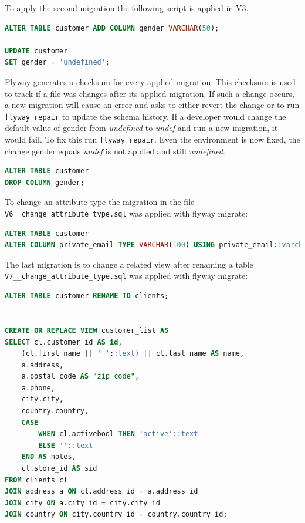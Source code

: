 %
To apply the second migration the following script is applied in V3.
\begin{lstlisting}[language=SQL]
ALTER TABLE customer ADD COLUMN gender VARCHAR(50);

UPDATE customer
SET gender = 'undefined';
\end{lstlisting}
Flyway generates a checksum for every applied migration. This checksum is used to track if a file was changes after its applied migration. If such a change occurs, a new migration will cause an error and asks to either revert the change or to run \texttt{flyway repair} to update the schema history.
If a developer would change the default value of gender from \textit{undefined} to \textit{undef} and run a new migration, it would fail. To fix this run \texttt{flyway repair}. Even the environment is now fixed, the change gender equals \textit{undef} is not applied and still \textit{undefined}.


%

\begin{lstlisting}[language=SQL]
ALTER TABLE customer
DROP COLUMN gender;
\end{lstlisting}


%
To change an attribute type the migration in the file \texttt{V6\_\_change\_attribute\_type.sql} was applied with flyway migrate:
\begin{lstlisting}[language=SQL]
ALTER TABLE customer
ALTER COLUMN private_email TYPE VARCHAR(100) USING private_email::varchar;
\end{lstlisting}


%
The last migration is to change a related view after renaming a table\\
\texttt{V7\_\_change\_attribute\_type.sql} was applied with flyway migrate:
\begin{lstlisting}[language=SQL]
ALTER TABLE customer RENAME TO clients;
	
	
CREATE OR REPLACE VIEW customer_list AS
SELECT cl.customer_id AS id,
	(cl.first_name || ' '::text) || cl.last_name AS name,
	a.address,
	a.postal_code AS "zip code",
	a.phone,
	city.city,
	country.country,
	CASE
		WHEN cl.activebool THEN 'active'::text
		ELSE ''::text
	END AS notes,
	cl.store_id AS sid
FROM clients cl
JOIN address a ON cl.address_id = a.address_id
JOIN city ON a.city_id = city.city_id
JOIN country ON city.country_id = country.country_id;
\end{lstlisting}

